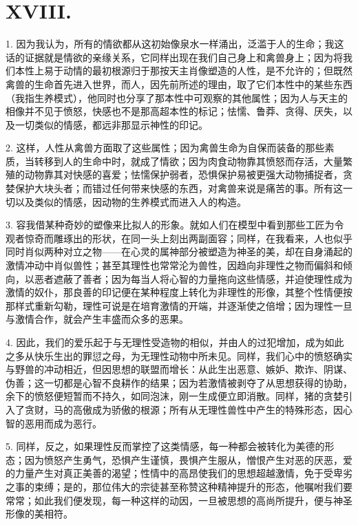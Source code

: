 
\section{XVIII. }

1. 因为我认为，所有的情欲都从这初始像泉水一样涌出，泛滥于人的生命；我这话的证据就是情欲的亲缘关系，它同样出现在我们自己身上和禽兽身上；因为将我们本性上易于动情的最初根源归于那按天主肖像塑造的人性，是不允许的；但既然禽兽的生命首先进入世界，而人，因先前所述的理由，取了它们本性中的某些东西（我指生养模式），他同时也分享了那本性中可观察的其他属性；因为人与天主的相像并不见于愤怒，快感也不是那高超本性的标记；怯懦、鲁莽、贪得、厌失，以及一切类似的情感，都远非那显示神性的印记。\par

2. 这样，人性从禽兽方面取了这些属性；因为禽兽生命为自保而装备的那些素质，当转移到人的生命中时，就成了情欲；因为肉食动物靠其愤怒而存活，大量繁殖的动物靠其对快感的喜爱；怯懦保护弱者，恐惧保护易被更强大动物捕捉者，贪婪保护大块头者；而错过任何带来快感的东西，对禽兽来说是痛苦的事。所有这一切以及类似的情感，因动物的生养模式而进入人的构造。\par

3. 容我借某种奇妙的塑像来比拟人的形象。就如人们在模型中看到那些工匠为令观者惊奇而雕琢出的形状，在同一头上刻出两副面容；同样，在我看来，人也似乎同时肖似两种对立之物——在心灵的属神部分被塑造为神圣的美，却在自身涌起的激情冲动中肖似兽性；甚至其理性也常常沦为兽性，因趋向非理性之物而偏斜和倾向，以恶者遮蔽了善者；因为每当人将心智的力量拖向这些情感，并迫使理性成为激情的奴仆，那良善的印记便在某种程度上转化为非理性的形像，其整个性情便按那样式重新勾勒，理性可说是在培育激情的开端，并逐渐使之倍增；因为理性一旦与激情合作，就会产生丰盛而众多的恶果。\par

4. 因此，我们的爱乐起于与无理性受造物的相似，并由人的过犯增加，成为如此之多从快乐生出的罪愆之母，为无理性动物中所未见。同样，我们心中的愤怒确实与野兽的冲动相近，但因思想的联盟而增长：从此生出恶意、嫉妒、欺诈、阴谋、伪善；这一切都是心智不良耕作的结果；因为若激情被剥夺了从思想获得的协助，余下的愤怒便短暂而不持久，如同泡沫，刚一生成便立即消散。同样，猪的贪婪引入了贪财，马的高傲成为骄傲的根源；所有从无理性兽性中产生的特殊形态，因心智的恶用而成为恶行。\par

5. 同样，反之，如果理性反而掌控了这类情感，每一种都会被转化为美德的形态；因为愤怒产生勇气，恐惧产生谨慎，畏惧产生服从，憎恨产生对恶的厌恶，爱的力量产生对真正美善的渴望；性情中的高昂使我们的思想超越激情，免于受卑劣之事的束缚；是的，那位伟大的宗徒甚至称赞这种精神提升的形态，他嘱咐我们要常常；如此我们便发现，每一种这样的动因，一旦被思想的高尚所提升，便与神圣形像的美相符。\par

